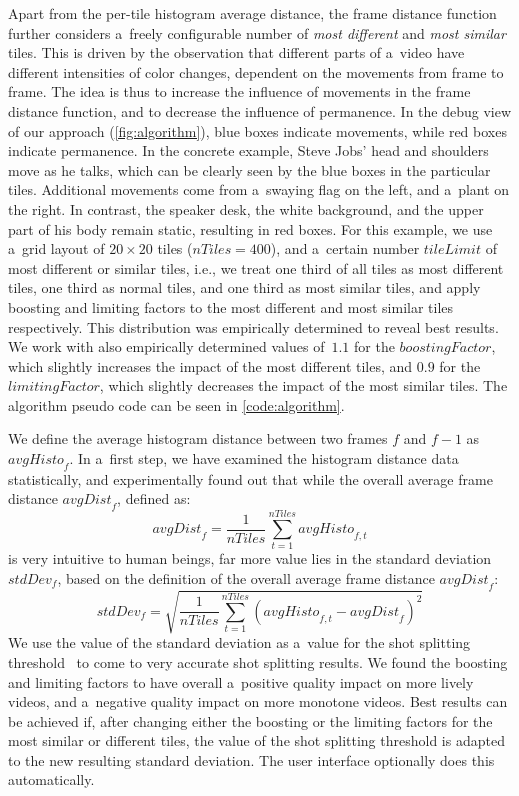 Apart from the per-tile histogram average distance, the frame distance function further considers a~freely configurable number of \emph{most different} and \emph{most similar} tiles. This is driven by the observation that different parts of a~video have different intensities of color changes, dependent on the movements from frame to frame. The idea is thus to increase the influence of movements in the frame distance function, and to decrease the influence of permanence. In the debug view of our approach (\autoref{fig:algorithm}), blue boxes indicate movements, while red boxes indicate permanence. In the concrete example, Steve Jobs' head and shoulders move as he talks, which can be clearly seen by the blue boxes in the particular tiles. Additional movements come from a~swaying flag on the left, and a~plant on the right. In contrast, the speaker desk, the white background, and the upper part of his body remain static, resulting in red boxes. For this example, we use a~grid layout of $\mathit{20} \times \mathit{20}$ tiles ($\mathit{nTiles} = \mathit{400}$), and a~certain number $\mathit{tileLimit}$ of most different or similar tiles, i.e., we treat one third of all tiles as most different tiles, one third as normal tiles, and one third as most similar tiles, and apply boosting and limiting factors to the most different and most similar tiles respectively. This distribution was empirically determined to reveal best results. We work with also empirically determined values of~$\mathit{1.1}$ for the $\mathit{boostingFactor}$, which slightly increases the impact of the most different tiles, and $\mathit{0.9}$ for the $\mathit{limitingFactor}$, which slightly decreases the impact of the most similar tiles. The algorithm pseudo code can be seen in \autoref{code:algorithm}.

We define the average histogram distance between two frames $\mathit{f}$ and $\mathit{f - 1}$ as $\mathit{avgHisto}_{f}$. In a~first step, we have examined the histogram distance data statistically, and experimentally found out that while the overall average frame distance $\mathit{avgDist}_{f}$, defined as: $$\mathit{avgDist}_{f} = \frac{1}{\mathit{nTiles}}\sum_{t=1}^{\mathit{nTiles}}\mathit{avgHisto}_{f, t}$$ is very intuitive to human beings, far more value lies in the standard deviation $\mathit{stdDev}_{f}$, based on the definition of the overall average frame distance $\mathit{avgDist}_{f}$: $$\mathit{stdDev}_{f} = \sqrt{\frac{1}{\mathit{nTiles}}\sum_{t=1}^{\mathit{nTiles}}(\mathit{avgHisto}_{f, t} - \mathit{avgDist}_{f})^{2}}$$ We use the value of the standard deviation as a~value for the shot splitting threshold~\cite{Lienhart1999} to come to very accurate shot splitting results. We found the boosting and limiting factors to have overall a~positive quality impact on more lively videos, and a~negative quality impact on more monotone videos. Best results can be achieved if, after changing either the boosting or the limiting factors for the most similar or different tiles, the value of the shot splitting threshold is adapted to the new resulting standard deviation. The user interface optionally does this automatically.

